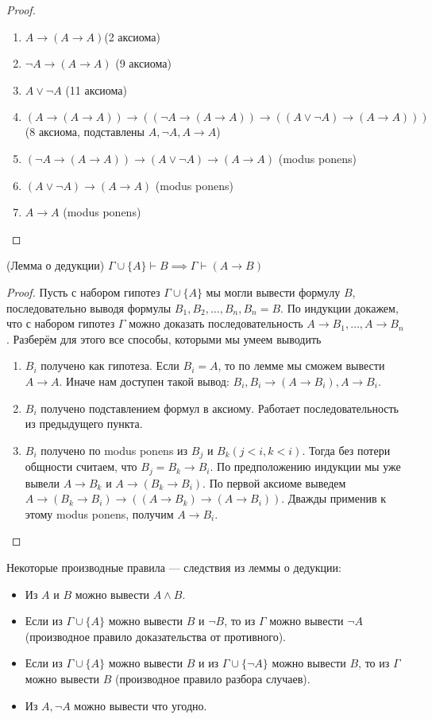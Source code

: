 \documentclass{article}
\begin{document}
\begin{proof}
	\begin{enumerate}
		\item \(A \to (A \to A)\)(2 аксиома)
		\item \(\lnot A \to (A \to A)\) (9 аксиома)
		\item \(A \lor \lnot A\) (11 аксиома)
		\item \((A \to (A \to A)) \to ((\lnot A \to (A \to A)) \to ((A \lor \lnot A) \to (A \to A)))\) (8 аксиома, подставлены \(A, \lnot A, A \to A\))
		\item \((\lnot A \to (A \to A)) \to (A \lor \lnot A) \to (A \to A)\) (modus ponens)
		\item \((A \lor \lnot A) \to (A \to A)\) (modus ponens)
		\item \(A \to A\) (modus ponens)
	\end{enumerate}
\end{proof}

\begin{theorem}{(Лемма о дедукции)}
	\(\Gamma \cup \{A\} \vdash B \implies \Gamma \vdash (A \to B)\)
\end{theorem}

\begin{proof}
	Пусть с набором гипотез \(\Gamma \cup \{A\}\) мы могли вывести формулу \(B\), последовательно выводя формулы \(B_1, B_2, \ldots, B_n, B_n = B\). По индукции докажем, что с набором гипотез \(\Gamma\) можно доказать последовательность \(A \to B_1, \ldots, A \to B_n\). Разберём для этого все способы, которыми мы умеем выводить
	\begin{enumerate}
	\item \(B_i\) получено как гипотеза. Если \(B_i = A\), то по лемме мы сможем вывести \(A \to A\). Иначе нам доступен такой вывод: \(B_i, B_i \to (A \to B_i), A \to B_i\).
	\item \(B_i\) получено подставлением формул в аксиому. Работает последовательность из предыдущего пункта.
	\item \(B_i\) получено по modus ponens из \(B_j\) и \(B_k(j < i , k < i)\). Тогда без потери общности считаем, что \(B_j = B_k \to B_i\). По предположению индукции мы уже вывели \(A \to B_k\) и \(A \to (B_k \to B_i)\). По первой аксиоме выведем \(A \to (B_k \to B_i) \to ((A \to B_k) \to (A \to B_i))\). Дважды применив к этому modus ponens, получим \(A \to B_i\).
	\end{enumerate}
\end{proof}
Некоторые производные правила --- следствия из леммы о дедукции:
\begin{itemize}
	\item Из \(A\) и \(B\) можно вывести \(A \land B\).
	\item Если из \(\Gamma \cup \{A\}\) можно вывести \(B\) и \(\lnot B\), то из \(\Gamma\) можно вывести \(\lnot A\) (производное правило доказательства от противного).
	\item Если из \(\Gamma \cup \{A\}\) можно вывести \(B\) и из \(\Gamma \cup \{\lnot A\}\) можно вывести \(B\), то из \(\Gamma\) можно вывести \(B\) (производное правило разбора случаев).
	\item Из \(A, \lnot A\) можно вывести что угодно.
\end{itemize}
\end{document}
